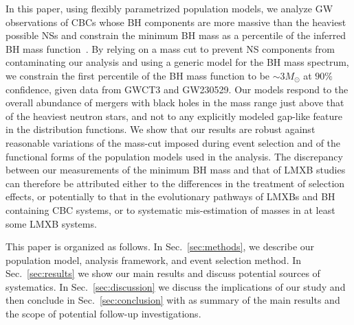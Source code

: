 \documentclass[modern]{aastex631}
\begin{document}
In this paper, using flexibly parametrized population models, we analyze GW
observations of CBCs whose BH components are more massive than the heaviest
possible NSs and constrain the minimum BH mass as a percentile of the inferred
BH mass function~\citep[simmilar to the approach of X-ray binary studies,
][]{Farr:2010tu}.  By relying on a mass cut to prevent NS components from
contaminating our analysis and using a generic model for the BH mass spectrum,
we constrain the first percentile of the BH mass function to be $\sim
3M_{\odot}$ at $90\%$ confidence, given data from GWCT3 and GW230529. Our models
respond to the overall abundance of mergers with black holes in the mass range
just above that of the heaviest neutron stars, and not to any explicitly modeled
gap-like feature in the distribution functions. We show that our results are
robust against reasonable variations of the mass-cut imposed during event
selection and of the functional forms of the population models used in the
analysis. The discrepancy between our measurements of the minimum BH mass and
that of LMXB studies can therefore be attributed either to the differences in
the treatment of selection effects, or potentially to that in the evolutionary
pathways of LMXBs and BH containing CBC systems, or to systematic mis-estimation
of masses in at least some LMXB systems.

This paper is organized as follows. In Sec.~\ref{sec:methods}, we describe our population model, analysis framework, and event selection method. In Sec.~\ref{sec:results} we show our main results and discuss potential sources of systematics. In Sec.~\ref{sec:discussion} we discuss the implications of our study and then conclude in Sec.~\ref{sec:conclusion} with as summary of the main results and the scope of potential follow-up investigations.
\end{document}
